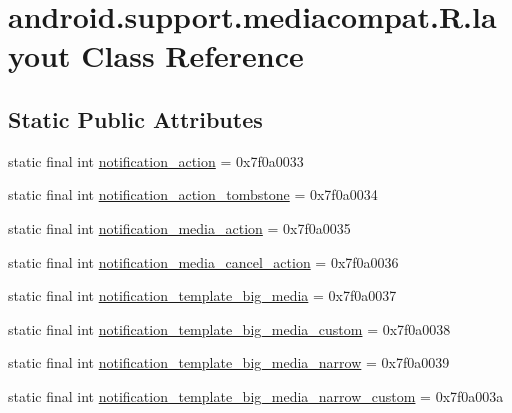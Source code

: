 \hypertarget{classandroid_1_1support_1_1mediacompat_1_1_r_1_1layout}{}\section{android.\+support.\+mediacompat.\+R.\+layout Class Reference}
\label{classandroid_1_1support_1_1mediacompat_1_1_r_1_1layout}
\subsection*{Static Public Attributes}
\begin{DoxyCompactItemize}
\item 
static final int \mbox{\hyperlink{classandroid_1_1support_1_1mediacompat_1_1_r_1_1layout_ab25d299914399f971acb340817848876}{notification\+\_\+action}} = 0x7f0a0033
\item 
static final int \mbox{\hyperlink{classandroid_1_1support_1_1mediacompat_1_1_r_1_1layout_a55962c7fb3b86ebe951cc7a2ca92c207}{notification\+\_\+action\+\_\+tombstone}} = 0x7f0a0034
\item 
static final int \mbox{\hyperlink{classandroid_1_1support_1_1mediacompat_1_1_r_1_1layout_abcade0350ba1b475e850cae81ee3248c}{notification\+\_\+media\+\_\+action}} = 0x7f0a0035
\item 
static final int \mbox{\hyperlink{classandroid_1_1support_1_1mediacompat_1_1_r_1_1layout_a0478c67fc8c1d467283f34208e912544}{notification\+\_\+media\+\_\+cancel\+\_\+action}} = 0x7f0a0036
\item 
static final int \mbox{\hyperlink{classandroid_1_1support_1_1mediacompat_1_1_r_1_1layout_a3e35d67668e93a2231704b7d96670c8a}{notification\+\_\+template\+\_\+big\+\_\+media}} = 0x7f0a0037
\item 
static final int \mbox{\hyperlink{classandroid_1_1support_1_1mediacompat_1_1_r_1_1layout_a9011bb386f5b3ed3fc16b1493a2c382d}{notification\+\_\+template\+\_\+big\+\_\+media\+\_\+custom}} = 0x7f0a0038
\item 
static final int \mbox{\hyperlink{classandroid_1_1support_1_1mediacompat_1_1_r_1_1layout_af4df4ca0ed9f4fd959614bf1aacd732a}{notification\+\_\+template\+\_\+big\+\_\+media\+\_\+narrow}} = 0x7f0a0039
\item 
static final int \mbox{\hyperlink{classandroid_1_1support_1_1mediacompat_1_1_r_1_1layout_aa1f59330e7339efaabd3ff44b2b4141d}{notification\+\_\+template\+\_\+big\+\_\+media\+\_\+narrow\+\_\+custom}} = 0x7f0a003a
\item 

\end{DoxyCompactItemize}
